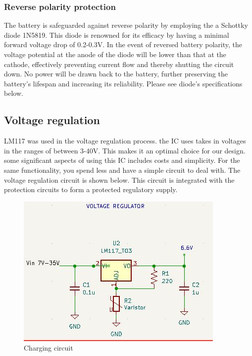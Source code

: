 \documentclass[class=report,11pt,crop=false]{standalone}
\begin{document}
	\subsubsection{Reverse polarity protection}
	\vspace{0.5cm}
	
	The battery is safeguarded against reverse polarity by employing the a Schottky diode 1N5819. This diode is renowned for its efficacy by having a minimal forward voltage drop of 0.2-0.3V. In the event of reversed battery polarity, the voltage potential at the anode of the diode will be lower than that at the cathode, effectively preventing current flow and thereby shutting the circuit down. No power will be drawn back to the battery, further preserving the battery's lifespan and increasing its reliability. Please see diode's specifications below.
	
	
	\subsection{Voltage regulation}
	LM117 was used in the voltage regulation process. the IC uses takes in voltages in the ranges of between 3-40V. This makes it an optimal choice for our design. some significant aspects of using this IC includes costs and simplicity. For the same functionality, you spend less and have a simple circuit to deal with. The voltage regulation circuit is shown below. This circuit is integrated with the protection circuits to form a protected regulatory supply.  
	
	
	\begin{figure}[h!]
		\centering
		\includegraphics[width=0.9\linewidth]{Figures/regulator.jpg}
		\caption{Charging circuit}
		\label{fig: P1}
	\end{figure}
	
\end{document}
